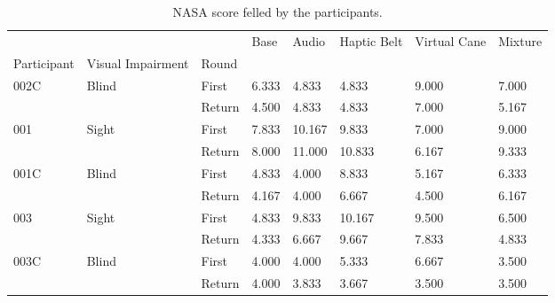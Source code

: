 
\begin{table}[!htb]
\centering
\caption{NASA score felled by the participants.}
\label{tab:nasa_table}
\begin{tabular}{llllllll}
\toprule
     &       &        &  Base &  Audio & Haptic Belt & Virtual Cane & Mixture \\
Participant & Visual Impairment & Round &       &        &             &              &         \\
\midrule
002C & Blind & First & 6.333 &  4.833 &       4.833 &        9.000 &   7.000 \\
     &       & Return & 4.500 &  4.833 &       4.833 &        7.000 &   5.167 \\
001 & Sight & First & 7.833 & 10.167 &       9.833 &        7.000 &   9.000 \\
     &       & Return & 8.000 & 11.000 &      10.833 &        6.167 &   9.333 \\
001C & Blind & First & 4.833 &  4.000 &       8.833 &        5.167 &   6.333 \\
     &       & Return & 4.167 &  4.000 &       6.667 &        4.500 &   6.167 \\
003 & Sight & First & 4.833 &  9.833 &      10.167 &        9.500 &   6.500 \\
     &       & Return & 4.333 &  6.667 &       9.667 &        7.833 &   4.833 \\
003C & Blind & First & 4.000 &  4.000 &       5.333 &        6.667 &   3.500 \\
     &       & Return & 4.000 &  3.833 &       3.667 &        3.500 &   3.500 \\
\bottomrule
\end{tabular}
\end{table}

